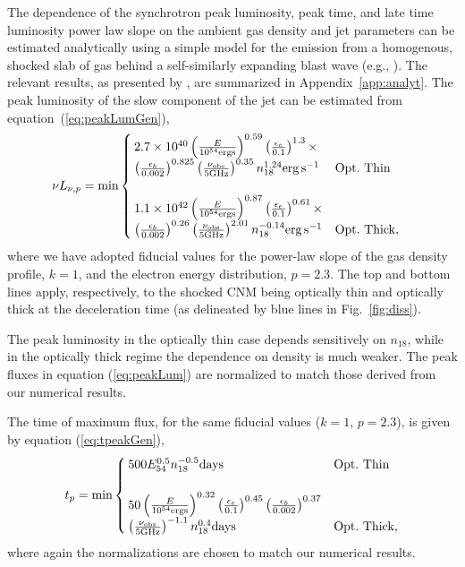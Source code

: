 \documentclass[usenatbib,fleqn]{mnras}
\begin{document}
The dependence of the synchrotron peak luminosity, peak time, and late
time luminosity power law slope on the ambient gas density and jet
parameters can be estimated analytically using a simple model for the
emission from a homogenous, shocked slab of gas behind a
self-similarly expanding blast wave (e.g., \citealt{Sari+98,
  Granot+02}).  The relevant results, as presented by
\citet{Leventis+2012}, are summarized in Appendix~\ref{app:analyt}.
The peak luminosity of the slow component of the jet can be estimated
from equation~(\ref{eq:peakLumGen}),
\begin{align}
\nu L_{\nu, p}&=\text{min}
\begin{cases}
  2.7\times 10^{40} \left(\frac{E}{10^{54} {\rm ergs}}\right)^{0.59}
  \left(\frac{\epsilon_e}{0.1}\right)^{1.3}\times \\
  \left(\frac{\epsilon_b}{0.002}\right)^{0.825}\left(\frac{\nu_{\rm
        obs}}{5 {\rm GHz}}\right)^{0.35} n_{18}^{1.24}
  {\rm erg \, s^{-1}} & {\rm Opt.~Thin}\\\\
  1.1 \times 10^{42} \left(\frac{E}{10^{54} {\rm ergs}}\right)^{0.87}
  \left(\frac{\epsilon_e}{0.1}\right)^{0.61}\times\\
  \left(\frac{\epsilon_b}{0.002}\right)^{0.26}\left(\frac{\nu_{\rm
        obs}}{5 {\rm GHz}}\right)^{2.01} n_{18}^{-0.14} {\rm erg\,
    s^{-1}} & {\rm Opt.~Thick},
\end{cases}
\label{eq:peakLum}
\end{align}
where we have adopted fiducial values for the power-law slope of the
gas density profile, $k=1$, and the electron energy distribution,
$p=2.3$.  The top and bottom lines apply, respectively, to the shocked
CNM being optically thin and optically thick at the deceleration time (as delineated by blue lines in Fig.~\ref{fig:diss}).

The peak luminosity in the optically thin case depends sensitively on
$n_{18}$, while in the optically thick regime the dependence on
density is much weaker.  The peak fluxes in equation (\ref{eq:peakLum}) are normalized to match those derived from our numerical results. 

The time of maximum flux, for the same fiducial values ($k = 1$,
$p=2.3$), is given by equation (\ref{eq:tpeakGen}),
\begin{align}
t_p= \text{min}
\begin{cases}
  500 E_{54}^{0.5} n_{18}^{-0.5} {\rm days} & {\rm Opt.~Thin}\\\\
  50 \left(\frac{E}{10^{54} {\rm ergs}}\right)^{0.32}
  \left(\frac{\epsilon_e}{0.1}\right)^{0.45}
  \left(\frac{\epsilon_b}{0.002}\right)^{0.37}\\
  \left(\frac{\nu_{\rm obs}}{5 {\rm GHz}}\right)^{-1.1} n_{18}^{0.4}
  {\rm days}& {\rm Opt.~Thick},
\end{cases}
\label{eq:peakTime}
\end{align}
where again the normalizations are chosen to match our numerical
results. 
\end{document}
